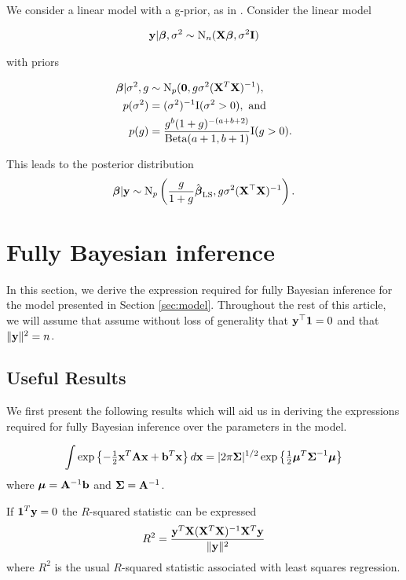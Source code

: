 \documentclass{amsart}[12pt]
\newcommand{\mgc}[1]{{\color{blue}#1}}
\begin{document}
We consider a linear model with a g-prior, as in \citep{Liang2008}. Consider the linear model

\begin{align*}
	{\bf y} | {\boldsymbol \beta}, \sigma^2 \sim \text{N}_n({\bf X} {\boldsymbol \beta}, \sigma^2 {\bf I}) 
\end{align*}

with priors

\begin{align*}
	{\boldsymbol\beta} | \sigma^2, g & \sim \text{N}_p({\bf 0}, g \sigma^2 ({\bf X}^T {\bf X})^{-1}),                     \\
	p(\sigma^2)          & = (\sigma^2)^{-1} \text{I}(\sigma^2 > 0), \text{ and }                    \\
	p(g)                 & = \frac{g^b (1 + g)^{-(a + b + 2)}}{\text{Beta}(a + 1, b + 1)} \text{I}(g > 0). 
\end{align*}



This leads to the posterior distribution
\[
	{\boldsymbol \beta} | {\bf y} \sim \text{N}_p\left(\frac{g}{1+g} \hat{{\boldsymbol \beta}}_{\text{LS}}, g \sigma^2 ({\bf X}^\top {\bf X})^{-1} \right).
\]

\section{Fully Bayesian inference}

In this section, we derive the expression required for fully Bayesian inference for the model presented in
Section \ref{sec:model}. Throughout the rest of this article, we will assume that assume without loss of
generality that ${\bf y}^\top{\bf1} = 0$ and that $\|{\bf y}\|^2 = n$.

\subsection{Useful Results}	

We first present the following results which will aid us in deriving the expressions required for fully Bayesian
inference over the parameters in the model.

\begin{equation}\label{res:01}
	\int \exp\left\{ -\tfrac{1}{2}{\bf x}^T{\bf A}{\bf x} + {\bf b}^T{\bf x} \right\} d {\bf x} = |2\pi{\boldsymbol\Sigma}|^{1/2} \exp\left\{ \tfrac{1}{2}{\boldsymbol \mu}^T{\boldsymbol \Sigma}^{-1}{\boldsymbol \mu} \right\}
\end{equation}
where ${\boldsymbol \mu} = {\bf A}^{-1}{\bf b}$ and ${\boldsymbol \Sigma} = {\bf A}^{-1}$.
 
If ${\bf 1}^T{\bf y}=0$ the $R$-squared statistic can be expressed
\begin{equation} \label{res:02}
	R^2 = \frac{{\bf y}^T{\bf X}({\bf X}^T{\bf X})^{-1}{\bf X}^T{\bf y}}{\|{\bf y}\|^2}
\end{equation}
where $R^2$ is the usual $R$-squared statistic associated with least squares regression.
\end{document}
